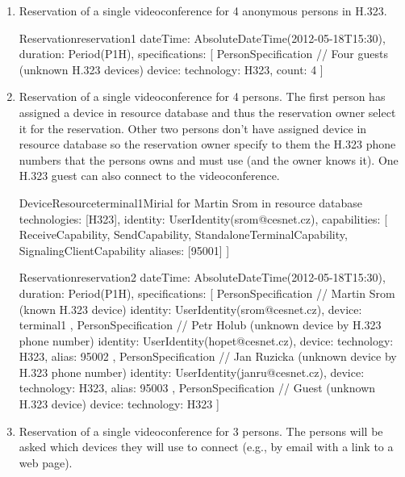 \begin{enumerate}
\item Reservation of a single videoconference for 4 anonymous persons in H.323.

\begin{EntityExample}{Reservation}{reservation1}{}
dateTime: AbsoluteDateTime(2012-05-18T15:30), duration: Period(P1H),
specifications: [
  PersonSpecification { // Four guests (unknown H.323 devices)
    device: {technology: H323},
    count: 4
  }
]
\end{EntityExample}

\item Reservation of a single videoconference for 4 persons. The first person  has assigned a device in resource database and thus the reservation owner select it for the reservation. Other two persons don't have assigned device in resource database so the reservation owner specify to them the H.323 phone numbers that the persons owns and must use (and the owner knows it). One H.323 guest can also connect to the videoconference.

\begin{EntityExample}{DeviceResource}{terminal1}{Mirial for Martin Srom in resource database}
technologies: [H323], 
identity: UserIdentity(srom@cesnet.cz),
capabilities: [
  ReceiveCapability, SendCapability, StandaloneTerminalCapability,
  SignalingClientCapability {aliases: [95001]}
]
\end{EntityExample}

\begin{EntityExample}{Reservation}{reservation2}{}
dateTime: AbsoluteDateTime(2012-05-18T15:30), duration: Period(P1H),
specifications: [
  PersonSpecification { // Martin Srom (known H.323 device)
    identity: UserIdentity(srom@cesnet.cz), 
    device: terminal1
  },
  PersonSpecification { // Petr Holub (unknown device by H.323 phone number)
    identity: UserIdentity(hopet@cesnet.cz), 
    device: {technology: H323, alias: 95002}
  },
  PersonSpecification { // Jan Ruzicka (unknown device by H.323 phone number)
    identity: UserIdentity(janru@cesnet.cz), 
    device: {technology: H323, alias: 95003}
  },
  PersonSpecification { // Guest (unknown H.323 device)
    device: {technology: H323}
  }
]
\end{EntityExample}

\item Reservation of a single videoconference for 3 persons. The persons will be asked which devices they will use to connect (e.g., by email with a link to a web page).


\end{enumerate}
